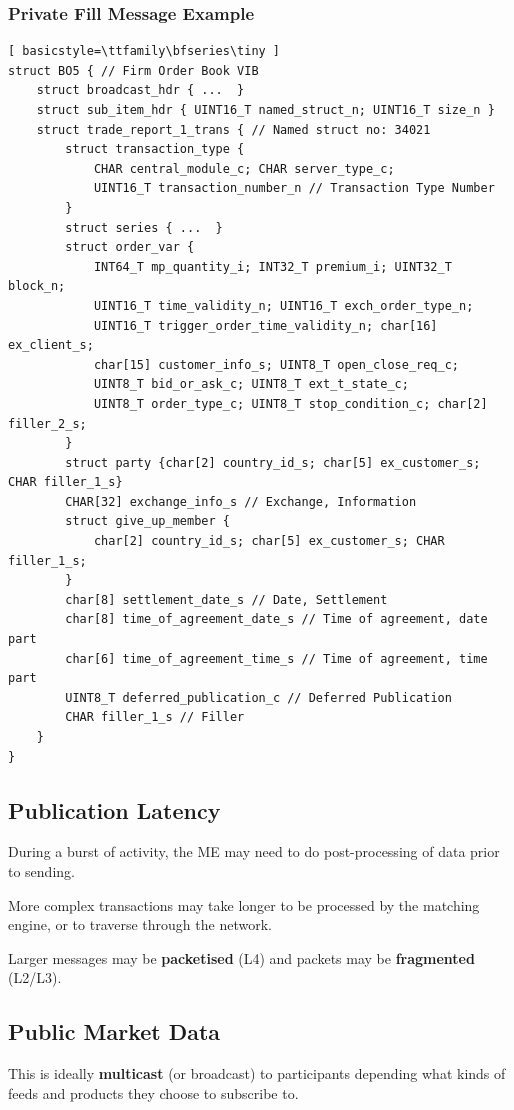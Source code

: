 \documentclass{article}
\begin{document}
\subsubsection{Private Fill Message Example}
\begin{lstlisting}[ basicstyle=\ttfamily\bfseries\tiny ]
struct BO5 { // Firm Order Book VIB
	struct broadcast_hdr { ...  }
	struct sub_item_hdr { UINT16_T named_struct_n; UINT16_T size_n }
	struct trade_report_1_trans { // Named struct no: 34021
		struct transaction_type {
			CHAR central_module_c; CHAR server_type_c;
			UINT16_T transaction_number_n // Transaction Type Number
		}
		struct series { ...  }
		struct order_var {
			INT64_T mp_quantity_i; INT32_T premium_i; UINT32_T block_n;
			UINT16_T time_validity_n; UINT16_T exch_order_type_n;
			UINT16_T trigger_order_time_validity_n; char[16] ex_client_s;
			char[15] customer_info_s; UINT8_T open_close_req_c;
			UINT8_T bid_or_ask_c; UINT8_T ext_t_state_c;
			UINT8_T order_type_c; UINT8_T stop_condition_c; char[2] filler_2_s;
		}
		struct party {char[2] country_id_s; char[5] ex_customer_s; CHAR filler_1_s}
		CHAR[32] exchange_info_s // Exchange, Information
		struct give_up_member {
			char[2] country_id_s; char[5] ex_customer_s; CHAR filler_1_s;
		}
		char[8] settlement_date_s // Date, Settlement
		char[8] time_of_agreement_date_s // Time of agreement, date part
		char[6] time_of_agreement_time_s // Time of agreement, time part
		UINT8_T deferred_publication_c // Deferred Publication
		CHAR filler_1_s // Filler
	}
}
\end{lstlisting}


\subsection{Publication Latency}
During a burst of activity, the ME may need to do post-processing of data prior to sending.

More complex transactions may take longer to be processed by the matching engine, or to traverse through the network.

Larger messages may be \textbf{packetised} (L4) and packets may be \textbf{fragmented} (L2/L3).

\subsection{Public Market Data}
This is ideally \textbf{multicast} (or broadcast) to participants depending what kinds of feeds and products they choose to subscribe to.
\end{document}

